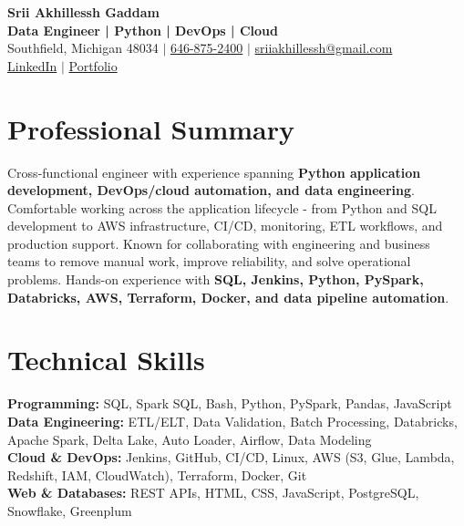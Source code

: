 \documentclass[letterpaper,10pt]{article}
\begin{document}
\fontsize{9.35pt}{10.45pt}\selectfont

\begin{center}
    {\LARGE \textbf{Srii Akhillessh Gaddam}} \\[-1pt]
    \textbf{Data Engineer | Python | DevOps | Cloud} \\[2pt]
    Southfield, Michigan 48034 $|$
    \href{tel:6468752400}{646-875-2400} $|$
    \href{mailto:sriiakhillessh@gmail.com}{sriiakhillessh@gmail.com} \\[1pt]
    \href{https://www.linkedin.com/in/srii-akhiilessh-gaddam-b48668191/}{LinkedIn} $|$
    \href{https://sriiakhillesshg.github.io/portfolio/}{Portfolio}
\end{center}
\vspace{-8pt}

\section{Professional Summary}
\small{Cross-functional engineer with experience spanning \textbf{Python application development, DevOps/cloud automation, and data engineering}. Comfortable working across the application lifecycle - from Python and SQL development to AWS infrastructure, CI/CD, monitoring, ETL workflows, and production support. Known for collaborating with engineering and business teams to remove manual work, improve reliability, and solve operational problems. Hands-on experience with \textbf{SQL, Jenkins, Python, PySpark, Databricks, AWS, Terraform, Docker, and data pipeline automation}.}

\section{Technical Skills}
\small{
\textbf{Programming:} SQL, Spark SQL, Bash, Python, PySpark, Pandas, JavaScript \\
\textbf{Data Engineering:} ETL/ELT, Data Validation, Batch Processing, Databricks, Apache Spark, Delta Lake, Auto Loader, Airflow, Data Modeling \\
\textbf{Cloud \& DevOps:} Jenkins, GitHub, CI/CD, Linux, AWS (S3, Glue, Lambda, Redshift, IAM, CloudWatch), Terraform, Docker, Git \\
\textbf{Web \& Databases:} REST APIs, HTML, CSS, JavaScript, PostgreSQL, Snowflake, Greenplum
}
\end{document}

